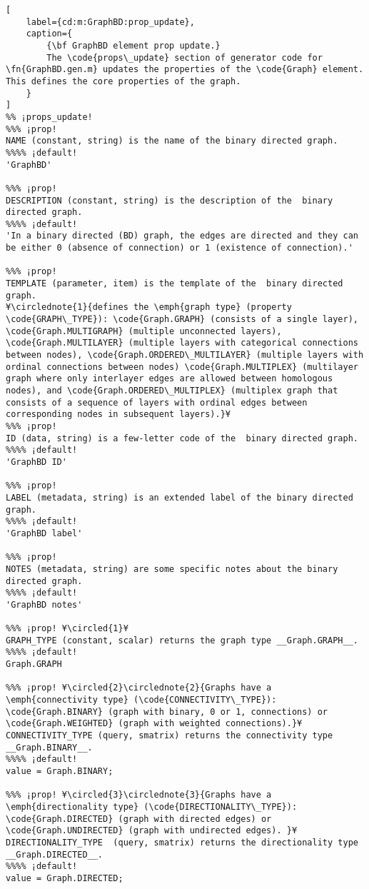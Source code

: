 \documentclass{tufte-handout}
\begin{document}
\begin{lstlisting}[
	label={cd:m:GraphBD:prop_update},
	caption={
		{\bf GraphBD element prop update.}
		The \code{props\_update} section of generator code for \fn{GraphBD.gen.m} updates the properties of the \code{Graph} element. This defines the core properties of the graph.
	}
]
%% ¡props_update!
%%% ¡prop!
NAME (constant, string) is the name of the binary directed graph.
%%%% ¡default!
'GraphBD'

%%% ¡prop!
DESCRIPTION (constant, string) is the description of the  binary directed graph.
%%%% ¡default!
'In a binary directed (BD) graph, the edges are directed and they can be either 0 (absence of connection) or 1 (existence of connection).'

%%% ¡prop!
TEMPLATE (parameter, item) is the template of the  binary directed graph.
¥\circlednote{1}{defines the \emph{graph type} (property \code{GRAPH\_TYPE}): \code{Graph.GRAPH} (consists of a single layer), \code{Graph.MULTIGRAPH} (multiple unconnected layers), \code{Graph.MULTILAYER} (multiple layers with categorical connections between nodes), \code{Graph.ORDERED\_MULTILAYER} (multiple layers with ordinal connections between nodes) \code{Graph.MULTIPLEX} (multilayer graph where only interlayer edges are allowed between homologous nodes), and \code{Graph.ORDERED\_MULTIPLEX} (multiplex graph that consists of a sequence of layers with ordinal edges between corresponding nodes in subsequent layers).}¥
%%% ¡prop!
ID (data, string) is a few-letter code of the  binary directed graph.
%%%% ¡default!
'GraphBD ID'

%%% ¡prop!
LABEL (metadata, string) is an extended label of the binary directed graph.
%%%% ¡default!
'GraphBD label'

%%% ¡prop!
NOTES (metadata, string) are some specific notes about the binary directed graph.
%%%% ¡default!
'GraphBD notes'

%%% ¡prop! ¥\circled{1}¥
GRAPH_TYPE (constant, scalar) returns the graph type __Graph.GRAPH__.
%%%% ¡default!
Graph.GRAPH

%%% ¡prop! ¥\circled{2}\circlednote{2}{Graphs have a \emph{connectivity type} (\code{CONNECTIVITY\_TYPE}): \code{Graph.BINARY} (graph with binary, 0 or 1, connections) or \code{Graph.WEIGHTED} (graph with weighted connections).}¥
CONNECTIVITY_TYPE (query, smatrix) returns the connectivity type __Graph.BINARY__.
%%%% ¡default!
value = Graph.BINARY;

%%% ¡prop! ¥\circled{3}\circlednote{3}{Graphs have a \emph{directionality type} (\code{DIRECTIONALITY\_TYPE}): \code{Graph.DIRECTED} (graph with directed edges) or \code{Graph.UNDIRECTED} (graph with undirected edges). }¥
DIRECTIONALITY_TYPE  (query, smatrix) returns the directionality type __Graph.DIRECTED__.
%%%% ¡default!
value = Graph.DIRECTED;


\end{lstlisting}
\end{document}
